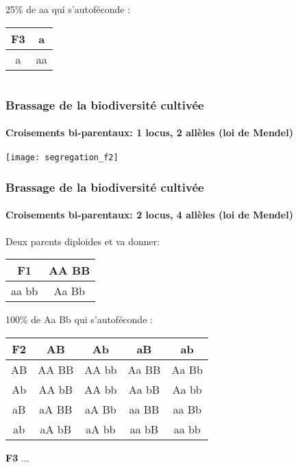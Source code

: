 \begin{frame}
\begin{columns}
\begin{column}{.3\textwidth}
\begin{center}
25\% de aa qui s'autoféconde : \\
\begin{tabular}{|c|c|}
\hline
\textbf{F3}& a  \\
\hline
a & \cellcolor{mln-green} aa \\
\hline
\end{tabular}
\end{center}
\end{column}

\end{columns}

\end{frame}


\begin{frame}
\frametitle{Brassage de la biodiversité cultivée}
\framesubtitle{Croisements bi-parentaux: 1 locus, 2 allèles (loi de Mendel)}

\begin{center}
\texttt{[image: segregation\_f2]}
\end{center}

\end{frame}


\begin{frame}
\frametitle{Brassage de la biodiversité cultivée}
\framesubtitle{Croisements bi-parentaux: 2 locus, 4 allèles (loi de Mendel)}

\begin{center}

Deux parents diploides  et  va donner:

\begin{tabular}{|c|c|}
\hline
\textbf{F1} & AA BB \\
\hline
aa bb & Aa Bb \\
\hline
\end{tabular}

\vspace{.5cm}

100\% de Aa Bb qui s'autoféconde : \\

\begin{tabular}{|c|c|c|c|c|}
\hline
\textbf{F2}& AB & Ab & aB & ab \\
\hline
AB & \cellcolor{mln-green} AA BB & AA bb & Aa BB & Aa Bb \\
\hline
Ab & AA bB & AA bb & Aa bB & Aa bb \\
\hline
aB & aA BB & aA Bb & aa BB & aa Bb \\
\hline
ab & aA bB & aA bb & aa bB & \cellcolor{mln-green} aa bb \\
\hline
\end{tabular}

\vspace{.5cm}

\textbf{F3} ... \\

\end{center}

\end{frame}


